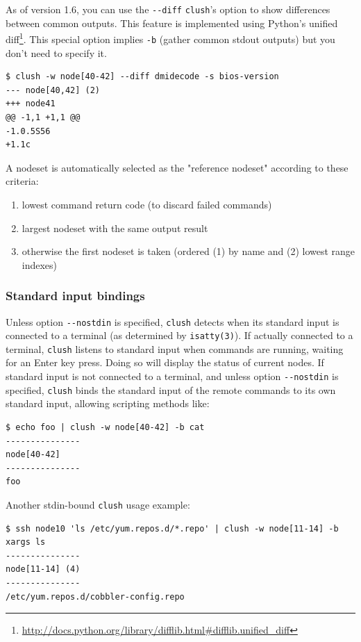 \documentclass[english,a4paper]{csuserguide}
\newcommand{\clush}{\texttt{clush}\xspace}
\begin{document}
As of version 1.6, you can use the \verb+--diff+ \clush's option to show differences between common outputs. This feature is implemented using Python's unified diff\footnote{\url{http://docs.python.org/library/difflib.html\#difflib.unified\_diff}}. This special option implies \verb+-b+ (gather common stdout outputs) but you don't need to specify it.
\bigskip

\begin{lstlisting}[breaklines=true, breakatwhitespace=true]
$ clush -w node[40-42] --diff dmidecode -s bios-version
--- node[40,42] (2)
+++ node41
@@ -1,1 +1,1 @@
-1.0.5S56
+1.1c
\end{lstlisting}

A nodeset is automatically selected as the "reference nodeset" according to these criteria:
\begin{enumerate}
\item{lowest command return code (to discard failed commands)}
\item{largest nodeset with the same output result}
\item{otherwise the first nodeset is taken (ordered (1) by name and (2) lowest range indexes)}
\end{enumerate}

\subsubsection{Standard input bindings}
Unless  option  \verb+--nostdin+  is  specified, \clush detects when its standard input is connected to a terminal (as determined by \verb+isatty(3)+). If actually connected to a terminal, \clush listens to standard input when commands are running, waiting for an Enter key press. Doing so will display the status of current nodes. If standard input is not connected to a terminal, and unless option \verb+--nostdin+ is specified, \clush binds the standard input of the remote commands to its own standard input, allowing scripting methods like:
\bigskip

\begin{lstlisting}[breaklines=true, breakatwhitespace=true]
$ echo foo | clush -w node[40-42] -b cat
---------------
node[40-42]
---------------
foo
\end{lstlisting}

\pagebreak[1]

Another stdin-bound \clush usage example:

\bigskip

\begin{lstlisting}[breaklines=true, breakatwhitespace=true]
$ ssh node10 'ls /etc/yum.repos.d/*.repo' | clush -w node[11-14] -b xargs ls 
---------------
node[11-14] (4)
---------------
/etc/yum.repos.d/cobbler-config.repo
\end{lstlisting}
\end{document}
